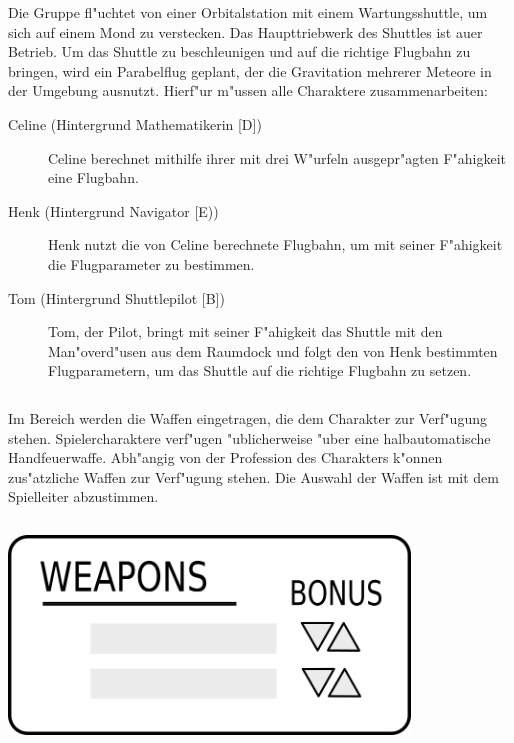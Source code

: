 \medskip
\begin{ruleexample}
    Die Gruppe fl"uchtet von einer Orbitalstation mit einem Wartungsshuttle, um sich auf einem Mond zu verstecken. Das Haupttriebwerk des Shuttles ist au\3er Betrieb. Um das Shuttle zu beschleunigen und auf die richtige Flugbahn zu bringen, wird ein Parabelflug geplant, der die Gravitation mehrerer Meteore in der Umgebung ausnutzt. Hierf"ur m"ussen alle Charaktere zusammenarbeiten:

\begin{description}
        \item[Celine ({Hintergrund Mathematikerin [D]})] Celine berechnet mithilfe ihrer mit drei W"urfeln ausgepr"agten F"ahigkeit 
             eine Flugbahn.
        \item[Henk ({Hintergrund Navigator [E)})] Henk nutzt die von Celine berechnete Flugbahn, um mit seiner F"ahigkeit  
            die Flugparameter zu bestimmen.
        \item[Tom ({Hintergrund Shuttlepilot [B]})] Tom, der Pilot, bringt mit seiner F"ahigkeit  das Shuttle mit den 
            Man"overd"usen aus dem Raumdock und folgt den von Henk bestimmten Flugparametern, um das Shuttle auf die richtige Flugbahn zu setzen.
    \end{description}
\end{ruleexample}

\begin{column}[l]{0.55}
    Im Bereich  werden die Waffen eingetragen, die dem Charakter zur Verf"ugung stehen. Spielercharaktere verf"ugen "ublicherweise "uber eine halbautomatische Handfeuerwaffe. Abh"angig von der Profession des Charakters k"onnen zus"atzliche Waffen zur Verf"ugung stehen. Die Auswahl der Waffen ist mit dem Spielleiter abzustimmen.
\end{column}
\begin{column}[r]{0.45}
    \centering
    \includegraphics[width=0.80\textwidth]{images/character_weapons.png}
\end{column}
\medskip

